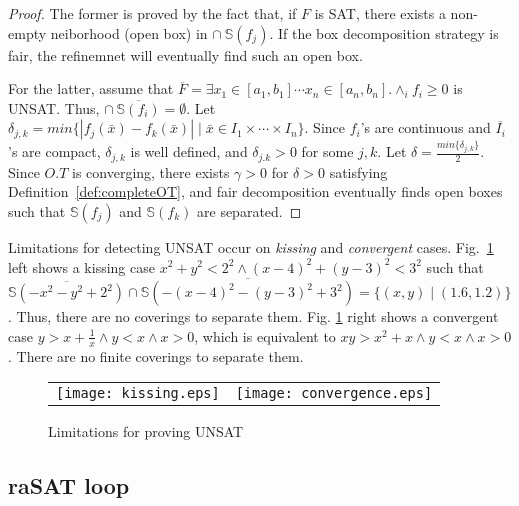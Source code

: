 \begin{proof} 
The former is proved by the fact that, if $F$ is SAT, there exists a non-empty neiborhood (open box) 
in $\cap~\mathbb{S}(f_j)$. 
If the box decomposition strategy is fair, the refinemnet will eventually find such an open box. 

For the latter, assume that 
$\overline{F} = \exists x_1 \in [a_1,b_1] \cdots x_n \in [a_n,b_n] . \wedge_{i} f_i \geq 0$ is UNSAT. 
Thus, $\cap~\overline{\mathbb{S}(f_i)} = \emptyset$. 
Let $\delta_{j,k} = min \{|f_j(\bar{x}) - f_k(\bar{x})| \mid \bar{x} \in I_1 \times \cdots \times I_n\}$. 
Since $f_i$'s are continuous and $\overline{I_i}$'s are compact, $\delta_{j,k}$ is well defined,
and $\delta_{j.k} > 0$ for some $j,k$. 
Let $\delta = \frac{min \{ \delta_{j,k} \}}{2}$. 
Since $O.T$ is converging, there exists $\gamma > 0$ for $\delta > 0$ 
satisfying Definition~\ref{def:completeOT}, and fair decomposition eventually finds open boxes
such that $\mathbb{S}(f_j)$ and $\mathbb{S}(f_k)$ are separated. 
\end{proof}

Limitations for detecting UNSAT occur on \emph{kissing} and \emph{convergent} cases. 
Fig.~\ref{fig:limit} left shows a kissing case 
$x^2 + y^2 < 2^2 \wedge (x-4)^2 + (y-3)^2 < 3^2$ such that 
$\overline{\mathbb{S}(- x^2 - y^2 + 2^2)} \cap \overline{\mathbb{S}(- (x-4)^2 - (y-3)^2 + 3^2)} 
= \{(x,y) \mid (1.6, 1.2)\}$. 
Thus, there are no coverings to separate them. 
%
Fig. \ref{fig:limit} right shows a convergent case 
$y > x + \frac{1}{x} \wedge y < x \wedge x > 0$, which is equivalent to 
$xy > x^2 + x \wedge y < x \wedge x > 0$. 
There are no finite coverings to separate them. 

\begin{figure}[ht]
\centering
\begin{tabular}{cc}
\texttt{[image: kissing.eps]} &
\texttt{[image: convergence.eps]}
\end{tabular}
\caption{Limitations for proving UNSAT} 
\label{fig:limit} 
\end{figure} 



\subsection{raSAT loop}

